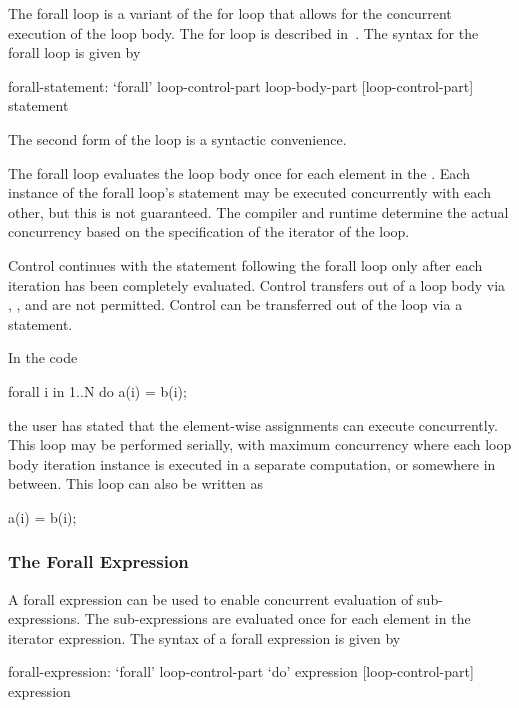 The forall loop is a variant of the for loop that allows for the
concurrent execution of the loop body. The for loop is described
in~. The syntax for the forall loop is given by
\begin{syntax}
forall-statement:
  `forall' loop-control-part loop-body-part
  [loop-control-part] statement
\end{syntax}
The second form of the loop is a syntactic convenience.

The forall loop evaluates the loop body once for each element in
the .  Each instance of the forall loop's
statement may be executed concurrently with each other, but this is
not guaranteed.  The compiler and runtime determine the actual
concurrency based on the specification of the iterator of the loop.

Control continues with the statement following the forall loop only
after each iteration has been completely evaluated.  Control transfers
out of a loop body via , ,
and  are not permitted.  Control can be transferred out
of the loop via a  statement.

\begin{example}
In the code
\begin{chapel}
forall i in 1..N do
  a(i) = b(i);
\end{chapel}
the user has stated that the element-wise assignments can execute
concurrently.  This loop may be performed serially, with maximum
concurrency where each loop body iteration instance is executed in a
separate computation, or somewhere in between.  This loop can also be
written as
\begin{chapel}
[i in 1..N] a(i) = b(i);
\end{chapel}
\end{example}

\subsubsection{The Forall Expression}
\label{Forall_Expressions}

A forall expression can be used to enable concurrent evaluation of
sub-expressions.  The sub-expressions are evaluated once for each
element in the iterator expression.  The syntax of a forall expression
is given by
\begin{syntax}
forall-expression:
  `forall' loop-control-part `do' expression
  [loop-control-part] expression
\end{syntax}

